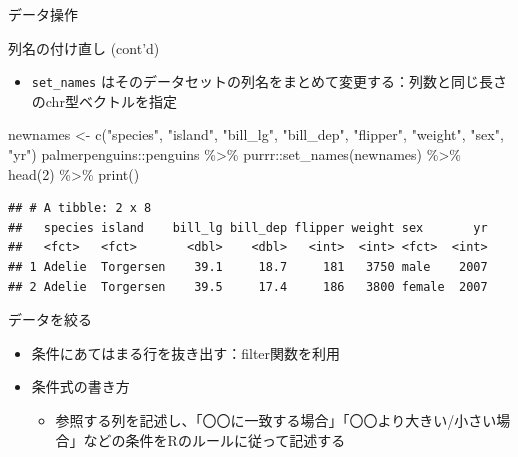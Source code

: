\documentclass[
  ignorenonframetext,
]{beamer}
\newenvironment{Shaded}{\begin{snugshade}}{\end{snugshade}}
\newcommand{\DecValTok}[1]{\textcolor[rgb]{0.00,0.00,0.81}{#1}}
\newcommand{\FunctionTok}[1]{\textcolor[rgb]{0.00,0.00,0.00}{#1}}
\newcommand{\NormalTok}[1]{#1}
\newcommand{\OtherTok}[1]{\textcolor[rgb]{0.56,0.35,0.01}{#1}}
\newcommand{\SpecialCharTok}[1]{\textcolor[rgb]{0.00,0.00,0.00}{#1}}
\newcommand{\StringTok}[1]{\textcolor[rgb]{0.31,0.60,0.02}{#1}}
\providecommand{\tightlist}{%
  \setlength{\itemsep}{0pt}\setlength{\parskip}{0pt}}
\begin{document}
\begin{frame}[fragile]{データ操作}
\begin{block}{列名の付け直し (cont'd)}
\protect\hypertarget{ux5217ux540dux306eux4ed8ux3051ux76f4ux3057-contd}{}
\begin{itemize}
\tightlist
\item
  \texttt{set\_names}
  はそのデータセットの列名をまとめて変更する：列数と同じ長さのchr型ベクトルを指定
\end{itemize}

\begin{Shaded}
\begin{Highlighting}[]
\NormalTok{newnames }\OtherTok{\textless{}{-}} \FunctionTok{c}\NormalTok{(}\StringTok{"species"}\NormalTok{, }\StringTok{"island"}\NormalTok{, }\StringTok{"bill\_lg"}\NormalTok{, }\StringTok{"bill\_dep"}\NormalTok{, }\StringTok{"flipper"}\NormalTok{, }\StringTok{"weight"}\NormalTok{, }\StringTok{"sex"}\NormalTok{, }\StringTok{"yr"}\NormalTok{)}
\NormalTok{palmerpenguins}\SpecialCharTok{::}\NormalTok{penguins }\SpecialCharTok{\%\textgreater{}\%}
\NormalTok{  purrr}\SpecialCharTok{::}\FunctionTok{set\_names}\NormalTok{(newnames) }\SpecialCharTok{\%\textgreater{}\%}
  \FunctionTok{head}\NormalTok{(}\DecValTok{2}\NormalTok{) }\SpecialCharTok{\%\textgreater{}\%}
  \FunctionTok{print}\NormalTok{()}
\end{Highlighting}
\end{Shaded}

\begin{verbatim}
## # A tibble: 2 x 8
##   species island    bill_lg bill_dep flipper weight sex       yr
##   <fct>   <fct>       <dbl>    <dbl>   <int>  <int> <fct>  <int>
## 1 Adelie  Torgersen    39.1     18.7     181   3750 male    2007
## 2 Adelie  Torgersen    39.5     17.4     186   3800 female  2007
\end{verbatim}
\end{block}

\begin{block}{データを絞る}
\protect\hypertarget{ux30c7ux30fcux30bfux3092ux7d5eux308b}{}
\begin{itemize}
\tightlist
\item
  条件にあてはまる行を抜き出す：filter関数を利用
\item
  条件式の書き方

  \begin{itemize}
  \tightlist
  \item
    参照する列を記述し、「〇〇に一致する場合」「〇〇より大きい/小さい場合」などの条件をRのルールに従って記述する


\end{itemize}
\end{itemize}
\end{block}
\end{frame}
\end{document}
